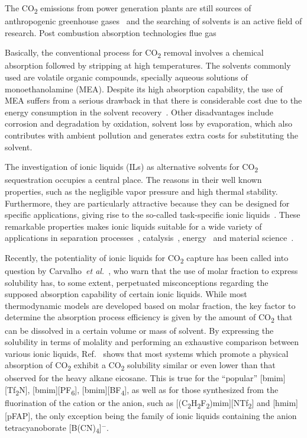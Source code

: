 \documentclass[3p,twocolumn]{elsarticle}
\begin{document}
The CO\textsubscript{2} emissions from power generation plants are still sources of anthropogenic greenhouse gases~\cite{totalenergy} and the searching of solvents is an active field of research. Post combustion absorption technologies flue gas

Basically, the conventional process for CO\textsubscript{2} removal involves a chemical absorption followed by stripping at high temperatures. The solvents commonly used are volatile organic compounds, specially aqueous solutions of monoethanolamine (MEA). Despite its high absorption capability, the use of MEA suffers from a serious drawback in that there is considerable cost due to the energy consumption in the solvent recovery~\cite{Merkel_2010}. Other disadvantages include corrosion and degradation by oxidation, solvent loss by evaporation, which also contributes with ambient pollution and generates extra costs for substituting the solvent.

The investigation of ionic liquids (ILs) as alternative solvents for CO\textsubscript{2} sequestration occupies a central place. The reasons in their well known properties, such as the negligible vapor pressure and high thermal stability. Furthermore, they are particularly attractive because they can be designed for specific applications, giving rise to the so-called task-specific ionic liquids~\cite{Seo_2014}. These remarkable properties makes ionic liquids suitable for a wide variety of applications in separation processes~\cite{Han_2010,Werner_2010}, catalysis~\cite{P_rvulescu_2007}, energy~\cite{MacFarlane_2014} and material science~\cite{Mecerreyes_2011,Tom_2015,Dupont_2010,Leones_2017,Kinik_2017}.

Recently, the potentiality of ionic liquids for CO\textsubscript{2} capture has been called into question by Carvalho~\textit{et al.}~\cite{Carvalho_2016}, who warn that the use of molar fraction to express solubility has, to some extent, perpetuated misconceptions regarding the supposed absorption capability of certain ionic liquids. While most thermodynamic models are developed based on molar fraction, the key factor to determine the absorption process efficiency is given by the amount of CO\textsubscript{2} that can be dissolved in a certain volume or mass of solvent. By expressing the solubility in terms of molality and performing an exhaustive comparison between various ionic liquids, Ref.~\cite{Carvalho_2016} shows that most systems which promote a physical absorption of CO\textsubscript{2} exhibit a CO\textsubscript{2} solubility similar or even lower than that observed for the heavy alkane eicosane. This is true for the ``popular'' [bmim][Tf\textsubscript{2}N], [bmim][PF\textsubscript{6}], [bmim][BF\textsubscript{4}], as well as for those synthesized from the fluorination of the cation or the anion, such as [(C\textsubscript{2}H\textsubscript{2}F\textsubscript{2})mim][NTf\textsubscript{2}] and [hmim][pFAP], the only exception being the family of ionic liquids containing the anion tetracyanoborate [B(CN)\textsubscript{4}]$^{-}$.
\end{document}
